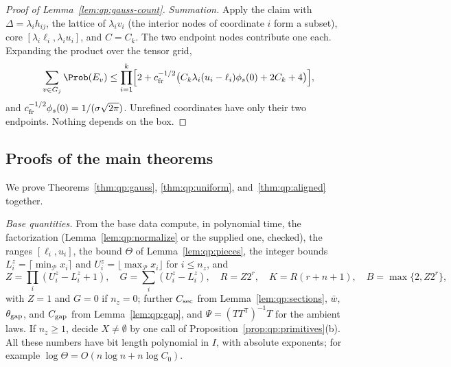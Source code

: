 \begin{proof}[Proof of Lemma~\ref{lem:qp:gauss-count}]
\emph{Summation.} Apply the claim with $\Delta=\lambda_ih_{ij}$, the lattice of
$\lambda_iv_i$ (the interior nodes of coordinate $i$ form a subset), core
$[\lambda_i\ell_i,\lambda_iu_i]$, and $C=C_k$. The two endpoint nodes
contribute one each. Expanding the product over the tensor grid,
\[
 \sum_{v\in G_j}\Prob(E_v)\le\prod_{i=1}^k\Bigl[2+c_{\rm fr}^{-1/2}\bigl(C_k\lambda_i(u_i-\ell_i)\phi_s(0)+2C_k+4\bigr)\Bigr],
\]
and $c_{\rm fr}^{-1/2}\phi_s(0)=1/(\sigma\sqrt{2\pi})$. Unrefined coordinates
have only their two endpoints. Nothing depends on the box.
\end{proof}

\subsection{Proofs of the main theorems}\label{app:qp:main}

We prove Theorems~\ref{thm:qp:gauss}, \ref{thm:qp:uniform},
and~\ref{thm:qp:aligned} together.

\emph{Base quantities.} From the base data compute, in polynomial time, the
factorization (Lemma~\ref{lem:qp:normalize} or the supplied one, checked), the
ranges $[\ell_i,u_i]$, the bound $\Theta$ of Lemma~\ref{lem:qp:pieces}, the
integer bounds $L_i^z=\lceil\min_{\mathcal P}x_i\rceil$ and
$U_i^z=\lfloor\max_{\mathcal P}x_i\rfloor$ for $i\le n_z$, and
\[
 Z=\prod_i(U_i^z-L_i^z+1),\quad G=\sum_i(U_i^z-L_i^z),\quad R=Z2^r,\quad
 K=R(r+n+1),\quad B=\max\{2,Z2^r\},
\]
with $Z=1$ and $G=0$ if $n_z=0$; further $C_{\rm sec}$ from
Lemma~\ref{lem:qp:sections}, $\bar w$, $\theta_{\rm gap}$, and $C_{\rm gap}$ from
Lemma~\ref{lem:qp:gap}, and $\Psi=(TT^{\mathsf T})^{-1}T$ for the ambient laws. If
$n_z\ge1$, decide $X\ne\emptyset$ by one call of
Proposition~\ref{prop:qp:primitives}(b). All these numbers have bit length
polynomial in $I$, with absolute exponents; for example
$\log\Theta=O(n\log n+n\log C_0)$.

